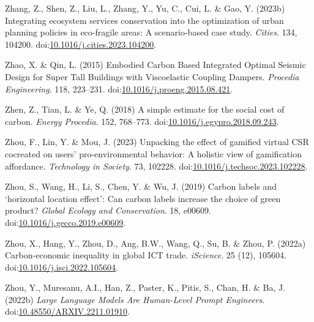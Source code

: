\documentclass[
  letterpaper,
  DIV=11,
  numbers=noendperiod]{scrartcl}
\newlength{\cslhangindent}
\newenvironment{CSLReferences}[2] %
 {\begin{list}{}{%
  \setlength{\itemindent}{0pt}
  \setlength{\leftmargin}{0pt}
  \setlength{\parsep}{0pt}
  \ifodd #1
   \setlength{\leftmargin}{\cslhangindent}
   \setlength{\itemindent}{-1\cslhangindent}
  \fi
  \setlength{\itemsep}{#2\baselineskip}}}
 {\end{list}}
\begin{document}
\begin{CSLReferences}{0}{1}
Zhang, Z., Shen, Z., Liu, L., Zhang, Y., Yu, C., Cui, L. \& Gao, Y.
(2023b) Integrating ecosystem services conservation into the
optimization of urban planning policies in eco-fragile areas: {A}
scenario-based case study. \emph{Cities}. 134, 104200.
doi:\href{https://doi.org/10.1016/j.cities.2023.104200}{10.1016/j.cities.2023.104200}.

Zhao, X. \& Qin, L. (2015) Embodied {Carbon Based Integrated Optimal
Seismic Design} for {Super Tall Buildings} with {Viscoelastic Coupling
Dampers}. \emph{Procedia Engineering}. 118, 223--231.
doi:\href{https://doi.org/10.1016/j.proeng.2015.08.421}{10.1016/j.proeng.2015.08.421}.

Zhen, Z., Tian, L. \& Ye, Q. (2018) A simple estimate for the social
cost of carbon. \emph{Energy Procedia}. 152, 768--773.
doi:\href{https://doi.org/10.1016/j.egypro.2018.09.243}{10.1016/j.egypro.2018.09.243}.

Zhou, F., Lin, Y. \& Mou, J. (2023) Unpacking the effect of gamified
virtual {CSR} cocreated on users' pro-environmental behavior: {A}
holistic view of gamification affordance. \emph{Technology in Society}.
73, 102228.
doi:\href{https://doi.org/10.1016/j.techsoc.2023.102228}{10.1016/j.techsoc.2023.102228}.

Zhou, S., Wang, H., Li, S., Chen, Y. \& Wu, J. (2019) Carbon labels and
{`horizontal location effect'}: {Can} carbon labels increase the choice
of green product? \emph{Global Ecology and Conservation}. 18, e00609.
doi:\href{https://doi.org/10.1016/j.gecco.2019.e00609}{10.1016/j.gecco.2019.e00609}.

Zhou, X., Hang, Y., Zhou, D., Ang, B.W., Wang, Q., Su, B. \& Zhou, P.
(2022a) Carbon-economic inequality in global {ICT} trade.
\emph{iScience}. 25 (12), 105604.
doi:\href{https://doi.org/10.1016/j.isci.2022.105604}{10.1016/j.isci.2022.105604}.

Zhou, Y., Muresanu, A.I., Han, Z., Paster, K., Pitis, S., Chan, H. \&
Ba, J. (2022b) \emph{Large {Language Models Are Human-Level Prompt
Engineers}}.
doi:\href{https://doi.org/10.48550/ARXIV.2211.01910}{10.48550/ARXIV.2211.01910}.


\end{CSLReferences}
\end{document}

